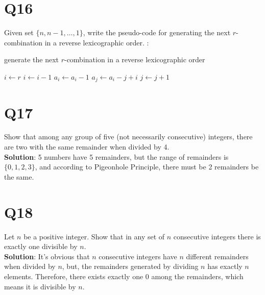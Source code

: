 \documentclass[11pt]{article}
\newenvironment{solution}{{\\\bf Solution}:}{\smallskip}
\begin{document}
\section*{Q16}
Given set $\{ n,n-1, \ldots ,1 \}$, write the pseudo-code for generating the next $r$-combination in a reverse lexicographic order.
\begin{solution}
    \begin{algorithm}
        \caption{generate the next $r$-combination in a reverse
        lexicographic order}
        \begin{algorithmic}
            \State $i\gets r$
                \State $i\gets i-1$
            \EndWhile
            \State $a_{i}\gets a_{i}-1$
            \State $a_{j}\gets a_{i}-j+i$
            \State $j\gets j+1$
            \EndFor
        \EndProcedure
        \end{algorithmic}
    \end{algorithm}
\end{solution}

\section*{Q17}
Show that among any group of ﬁve (not necessarily consecutive) integers, there are two with the same remainder when divided by 4.
\begin{solution}
    5 numbers have 5 remainders, but the range of remainders is 
    $\{ 0,1,2,3 \}$, and according to Pigeonhole Principle, there 
    must be 2 remainders be the same.
\end{solution}

\section*{Q18}
Let $n$ be a positive integer. Show that in any set of $n$ consecutive integers there is exactly one divisible by $n$.
\begin{solution}
    It's obvious that $n$ consecutive integers have $n$ different
    remainders when divided by $n$, but, the remainders generated 
    by dividing $n$ has exactly $n$ elements. Therefore, there exists
    exactly one 0 among the remainders, 
    which means it is divisible by $n$.
\end{solution}
\end{document}
